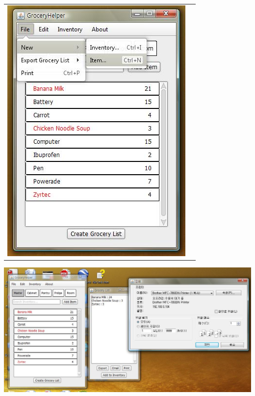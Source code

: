 \documentclass[letterpaper,12pt]{article}
\begin{document}
\begin{table}[H]
\begin{tabular}{c c}
\begin{minipage}{0.35\textwidth}
\includegraphics[width=\textwidth]{w03.png}
\end{minipage}

\end{tabular}
\end{table}



\centerline{\includegraphics[scale=0.45]{w004.png}}	
\end{document}
